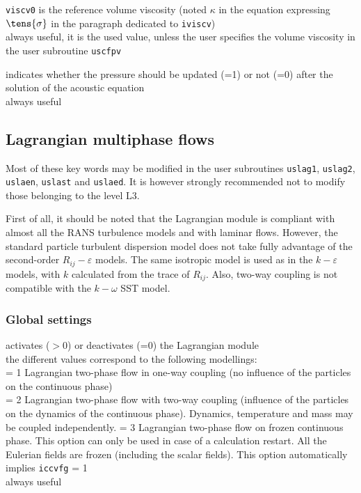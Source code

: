 {\texttt{viscv0} is the reference volume
viscosity (noted $\kappa$ in the equation expressing $\tens{\sigma}$ in the
paragraph dedicated to \texttt{iviscv})\\
always useful, it is the used value, unless the user specifies the volume
viscosity in the user subroutine \texttt{uscfpv}}

{indicates whether the pressure should be updated (=1) or not (=0) after the
solution of the acoustic equation\\
always useful}

\subsection{Lagrangian multiphase flows}
\label{sec:prg_motscles_lagr}

Most of these key words may be modified in the user subroutines
\texttt{uslag1}, \texttt{uslag2}, \texttt{uslaen},
\texttt{uslast} and \texttt{uslaed}. It is however strongly recommended
not to modify those belonging to the level L3.

First of all, it should be noted that the Lagrangian module is compliant with
almost all the RANS turbulence models and with laminar flows. However, the standard particle
turbulent dispersion model does not take fully advantage of the second-order
$R_{ij}-\varepsilon$ models. The same isotropic model is used as in the
$k-\varepsilon$ models, with $k$ calculated from the trace of $R_{ij}$. Also,
two-way coupling is not compatible with the $k-\omega$ SST model.


\subsubsection{Global settings}

{activates ($>$0) or deactivates (=0) the Lagrangian module\\
the different values correspond to the following modellings: \\
\hspace*{1.3cm} = 1 Lagrangian two-phase flow in one-way coupling (no influence of
the particles on the continuous phase)\\
\hspace*{1.3cm} = 2 Lagrangian two-phase flow with two-way coupling (influence of
the particles on the dynamics of the continuous phase). Dynamics, temperature and mass may be coupled independently.
\hspace*{1.3cm} = 3 Lagrangian two-phase flow on frozen continuous phase. This option can
only be used in case of a calculation restart. All the
Eulerian fields are frozen (including the scalar fields). This option
automatically implies \texttt{iccvfg} = 1\\
always useful}

